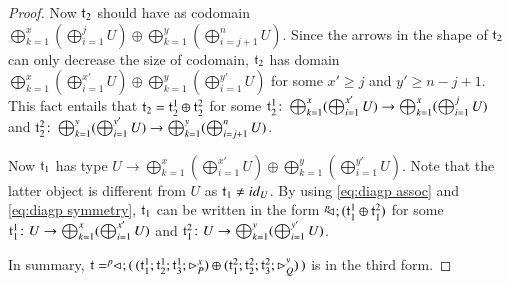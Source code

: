 \begin{proof}
Now $\mathfrak{t}_2$ should have as codomain $ \bigoplus_{k=1}^x(\bigoplus_{i=1}^{j} U) \oplus \bigoplus_{k=1}^y(\bigoplus_{i=j+1}^{n} U)$. Since the arrows in the shape of $\mathfrak{t}_2$ can only decrease the size of codomain, $\mathfrak{t}_2$ has domain $ \bigoplus_{k=1}^x(\bigoplus_{i=1}^{x'} U) \oplus \bigoplus_{k=1}^y(\bigoplus_{i=1}^{y'} U)$ for some $x'\geq j$ and $y'\geq n-j+1$.
This fact entails that $\mathfrak{t}_2=\mathfrak{t}_2^1 \oplus \mathfrak{t}_2^2$ for some $\mathfrak{t}_2^1 \colon \bigoplus_{k=1}^x(\bigoplus_{i=1}^{x'} U) \to  \bigoplus_{k=1}^x(\bigoplus_{i=1}^{j} U)$ and $\mathfrak{t}_2^2 \colon \bigoplus_{k=1}^y(\bigoplus_{i=1}^{y'} U) \to  \bigoplus_{k=1}^y(\bigoplus_{i=j+1}^{n} U)$.

Now $\mathfrak{t}_1$ has type $U \to \bigoplus_{k=1}^x(\bigoplus_{i=1}^{x'} U) \oplus \bigoplus_{k=1}^y(\bigoplus_{i=1}^{y'} U)$. Note that the latter object is different from $U$ as $\mathfrak{t}_1\neq {id}_{U}$. By using \eqref{eq:diagp assoc} and \eqref{eq:diagp symmetry}, $\mathfrak{t}_1$ can be written in the form $^p\!\! \lhd_{}; (\mathfrak{t}_1^1\oplus \mathfrak{t}_1^2)$ for some $\mathfrak{t}_1^1\colon U \to \bigoplus_{k=1}^x(\bigoplus_{i=1}^{x'} U)$ and $\mathfrak{t}_1^2\colon U \to \bigoplus_{k=1}^y(\bigoplus_{i=1}^{y'} U)$.

In summary, $\mathfrak{t}=^p\!\! \lhd_{};(\, (\mathfrak{t}_1^1;\mathfrak{t}_2^1; \mathfrak{t}_3^1; \rhd_{P}^x) \oplus (\mathfrak{t}_1^2;\mathfrak{t}_2^2; \mathfrak{t}_3^2; \rhd_{Q}^y) \,)$ is in the third form.

\end{proof}

